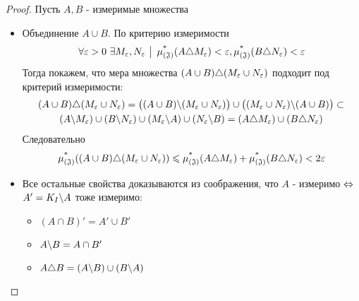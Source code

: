 \begin{proof}
	Пусть $A, B$ - измеримые множества
	\begin{itemize}
		\item Объединение $A \cup B$. По критерию измеримости
		\[
			\forall \varepsilon > 0\ \exists M_\varepsilon, N_\varepsilon \ \big|\  \operatorname{\mu^*_{(\mathfrak{J})}}(A \triangle M_\varepsilon) < \varepsilon, \operatorname{\mu^*_{(\mathfrak{J})}}(B \triangle N_\varepsilon) < \varepsilon
		\]
		Тогда покажем, что мера множества $(A \cup B) \triangle (M_\varepsilon \cup N_\varepsilon)$ подходит под критерий измеримости:
		\begin{multline*}
			(A \cup B) \triangle (M_\varepsilon \cup N_\varepsilon) = \big((A \cup B) \backslash (M_\varepsilon \cup N_\varepsilon)\big) \cup \big((M_\varepsilon \cup N_\varepsilon) \backslash (A \cup B)\big) \subset
			\\
			(A \backslash M_\varepsilon) \cup (B \backslash N_\varepsilon) \cup (M_\varepsilon \backslash A) \cup (N_\varepsilon \backslash B) = (A \triangle M_\varepsilon) \cup (B \triangle N_\varepsilon)
		\end{multline*}
		Следовательно
		\[
			\operatorname{\mu^*_{(\mathfrak{J})}}((A \cup B) \triangle (M_\varepsilon \cup N_\varepsilon)) \leqslant \operatorname{\mu^*_{(\mathfrak{J})}}(A \triangle M_\varepsilon) + \operatorname{\mu^*_{(\mathfrak{J})}}(B \triangle N_\varepsilon) < 2\varepsilon
		\]
		
		\item Все остальные свойства доказываются из соображения, что $A$ - измеримо $\Leftrightarrow$ $A' = K_I \backslash A$ тоже измеримо:
		\begin{itemize}
			\item \((A \cap B)' = A' \cup B'\)
			
			\item \(A \backslash B = A \cap B'\)
			
			\item \(A \triangle B = (A \backslash B) \cup (B \backslash A)\)
		\end{itemize}
	\end{itemize}
\end{proof}